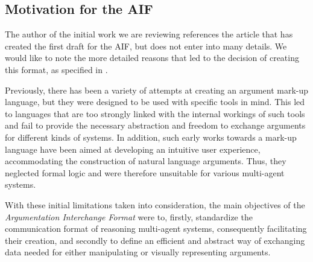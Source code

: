 \documentclass[12pt, a4paper]{article}
\begin{document}
\subsection{Motivation for the AIF}
The author of the initial work we are reviewing references the article that has created the first draft for the AIF, but does not enter into many details. We would like to note the more detailed reasons that led to the decision of creating this format, as specified in \cite{aif}.

Previously, there has been a variety of attempts at creating an argument mark-up language, but they were designed to be used with specific tools in mind. This led to languages that are too strongly linked with the internal workings of such tools and fail to provide the necessary abstraction and freedom to exchange arguments for different kinds of systems. In addition, such early works towards a mark-up language have been aimed at developing an intuitive user experience, accommodating the construction of natural language arguments. Thus, they neglected formal logic and were therefore unsuitable for various multi-agent systems.

With these initial limitations taken into consideration, the main objectives of the \emph{Argumentation Interchange Format} were to, firstly, standardize the communication format of reasoning multi-agent systems, consequently facilitating their creation, and secondly to define an efficient and abstract way of exchanging data needed for either manipulating or visually representing arguments.
\end{document}
